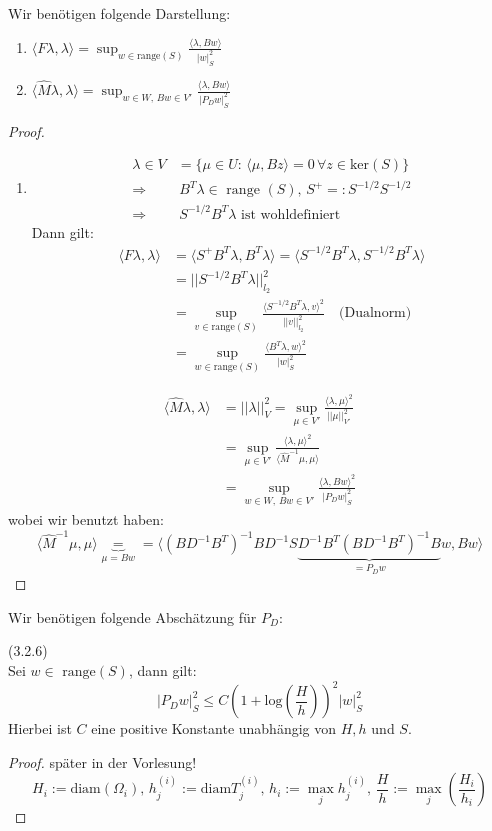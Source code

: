Wir benötigen folgende Darstellung:
\begin{enumerate}
\item
$\langle F\lambda,\lambda\rangle = \sup_{w\in \text{range}(S)} \frac{\langle \lambda, Bw \rangle }{|w|^2_S}$
\item
$\langle \hat M\lambda,\lambda\rangle = \sup_{w\in W,\, Bw \in V'} \frac{\langle \lambda, Bw \rangle }{|P_D w|^2_S}$
\end{enumerate}
\begin{proof}
\begin{enumerate}
\item
\begin{align*}
\lambda \in V&=\{ \mu \in U : \, \langle \mu,Bz \rangle =0 \, \forall z \in \text{ker}(S) \} \\
 \Rightarrow &  \, B^T\lambda \in\text{ range } (S) , \, S^+ =: S^{-1/2}S^{-1/2} \\
\Rightarrow & \, S^{-1/2}B^T\lambda \text{ ist wohldefiniert}
\end{align*}
Dann gilt:
\begin{align*}
 \langle F\lambda, \lambda \rangle &= \langle S^+ B^T\lambda , B^T \lambda \rangle = \langle S^{-1/2} B^T\lambda , S^{-1/2}B^T \lambda \rangle \\
&= || S^{-1/2} B^T \lambda||^2_{l_2} \\
&= \sup_{v \in \text{range} (S)} \frac{\langle S^{-1/2}B^T\lambda,v\rangle^2}{||v||^2_{l_2}} \quad \text{(Dualnorm)} \\
&= \sup_{w \in \text{range} (S)} \frac{\langle B^T\lambda,w \rangle^2}{|w|^2_S} 
\end{align*}
\end{enumerate}
\begin{align*}
\langle \hat M \lambda , \lambda \rangle &= ||\lambda||^2_V = \sup_{\mu \in V'} \frac{\langle \lambda , \mu \rangle^2}{||\mu ||^2_{V'}} \\
&= \sup_{\mu \in V'} \frac{\langle \lambda , \mu \rangle^2}{\langle {\hat M}^{-1} \mu, \mu \rangle} \\
&= \sup_{w \in W,\, Bw \in V'}	 \frac{\langle \lambda , Bw \rangle^2}{|P_D w|^2_S}
\end{align*}
wobei wir benutzt haben:
\[ \langle {\hat M}^{-1} \mu, \mu \rangle \underbrace{=}_{\mu =Bw} = \langle (BD^{-1}B^T)^{-1} B D^{-1} S \underbrace{D^{-1} B^T (B D^{-1} B^T)^{-1} B}_{=P_D w}w, Bw \rangle \]
\end{proof}
Wir benötigen folgende Abschätzung für $P_D$:
\begin{lemma}(3.2.6)\\
Sei $w \in \text{ range}(S)$, dann gilt:
\[ |P_D w |^2_S \leq C(1+\text{log} \left( \frac{H}{h}\right))^2|w|^2_S \]
Hierbei ist $C$ eine positive Konstante unabhängig von $H,h$ und $S$.
\end{lemma}
\begin{proof}
später in der Vorlesung!
\[ H_i := \text{diam} (\Omega_i),\,  h^{(i)}_j := \text{diam} T^{(i)}_j,\, h_i := \max_j h^{(i)}_j , \, \frac{H}{h} := \max_j \left( \frac{H_i}{h_i} \right) \]
\end{proof}
